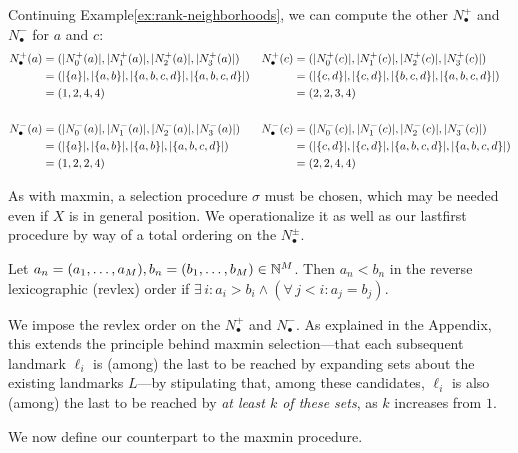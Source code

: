 \documentclass{article}
\begin{document}
\begin{example}\label{ex:rank-sequence}
Continuing Example\nbs\ref{ex:rank-neighborhoods}, we can compute the other $N_\bullet^+$ and $N_\bullet^-$ for $a$ and $c$:
\begin{align*}
    N_\bullet^+ (a) &= (\lvert N^+_0(a)\rvert, \lvert N^+_1(a)\rvert, \lvert N^+_2(a)\rvert, \lvert N^+_3(a)\rvert) &
    N_\bullet^+ (c) &= (\lvert N^+_0(c)\rvert, \lvert N^+_1(c)\rvert, \lvert N^+_2(c)\rvert, \lvert N^+_3(c)\rvert) \\
    &= (\lvert \{a\}\rvert, \lvert \{a, b\}\rvert, \lvert \{a, b, c, d\}\rvert, \lvert \{a, b, c, d\}\rvert) &
    &= (\lvert \{c, d\}\rvert, \lvert \{c, d\}\rvert, \lvert \{b, c, d\}\rvert, \lvert \{a, b, c, d\}\rvert) \\
    &= (1, 2, 4, 4) &
    &= (2, 2, 3, 4) \\
    \\
    N_\bullet^- (a) &= (\lvert N^-_0(a)\rvert, \lvert N^-_1(a)\rvert, \lvert N^-_2(a)\rvert, \lvert N^-_3(a)\rvert) &
    N_\bullet^- (c) &= (\lvert N^-_0(c)\rvert, \lvert N^-_1(c)\rvert, \lvert N^-_2(c)\rvert, \lvert N^-_3(c)\rvert) \\
    &= (\lvert \{a\}\rvert, \lvert \{a, b\}\rvert, \lvert \{a, b\}\rvert, \lvert \{a, b, c, d\}\rvert) &
    &= (\lvert \{c, d\}\rvert, \lvert \{c, d\}\rvert, \lvert \{a, b, c, d\}\rvert, \lvert \{a, b, c, d\}\rvert) \\
    &= (1, 2, 2, 4) &
    &= (2, 2, 4, 4)
\end{align*}
\end{example}

As with maxmin, a selection procedure \(\sigma\) must be chosen, which
may be needed even if \(X\) is in general position. We operationalize it
as well as our lastfirst procedure by way of a total ordering on the
\(N^\pm_\bullet\).

\begin{definition}
    Let $a_n = (a_1,\ldots,a_M),b_n = (b_1,\ldots,b_M)\in\mathbb{N}^M$.
    Then $a_n < b_n$ in the reverse lexicographic (revlex) order if $\exists\, i : a_i > b_i \wedge (\forall\, j<i : a_j = b_j)$.
\end{definition}

We impose the revlex order on the \(N_\bullet^+\) and \(N_\bullet^-\).
As explained in the Appendix, this extends the principle behind maxmin
selection---that each subsequent landmark \(\ell_i\) is (among) the last
to be reached by expanding sets about the existing landmarks \(L\)---by
stipulating that, among these candidates, \(\ell_i\) is also (among) the
last to be reached by \emph{at least \(k\) of these sets}, as \(k\)
increases from \(1\).

We now define our counterpart to the maxmin procedure.
\end{document}
